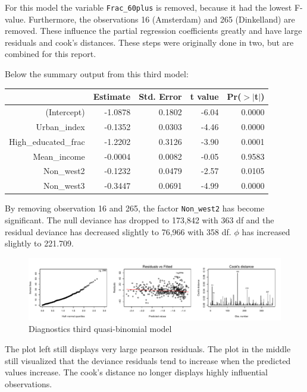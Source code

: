 \documentclass[11pt,]{article}
\begin{document}
For this model the variable \texttt{Frac\_60plus} is removed, because it
had the lowest F-value. Furthermore, the observations 16 (Amsterdam) and
265 (Dinkelland) are removed. These influence the partial regression
coefficients greatly and have large residuals and cook's distances.
These steps were originally done in two, but are combined for this
report.

Below the summary output from this third model:

\begin{table}[ht]
\centering
\begin{tabular}{rrrrr}
  \hline
 & Estimate & Std. Error & t value & Pr($>$$|$t$|$) \\ 
  \hline
(Intercept) & -1.0878 & 0.1802 & -6.04 & 0.0000 \\ 
  Urban\_index & -0.1352 & 0.0303 & -4.46 & 0.0000 \\ 
  High\_educated\_frac & -1.2202 & 0.3126 & -3.90 & 0.0001 \\ 
  Mean\_income & -0.0004 & 0.0082 & -0.05 & 0.9583 \\ 
  Non\_west2 & -0.1232 & 0.0479 & -2.57 & 0.0105 \\ 
  Non\_west3 & -0.3447 & 0.0691 & -4.99 & 0.0000 \\ 
   \hline
\end{tabular}
\end{table}

By removing observation 16 and 265, the factor \texttt{Non\_west2} has
become significant. The null deviance has dropped to 173,842 with 363 df
and the residual deviance has decreased slightly to 76,966 with 358 df.
\(\phi\) has increased slightly to 221.709.

\begin{figure}[H]

{\centering \includegraphics{Report_files/figure-latex/unnamed-chunk-18-1} 

}

\caption{\label{ass_mdl3}Diagnostics third quasi-binomial model}\label{fig:unnamed-chunk-18}
\end{figure}

The plot left still displays very large pearson residuals. The plot in
the middle still visualized that the deviance residuals tend to increase
when the predicted values increase. The cook's distance no longer
displays highly influential observations.
\end{document}
